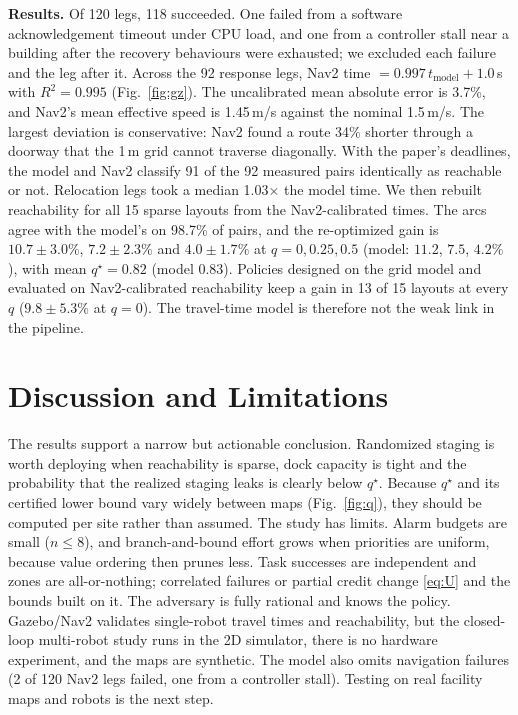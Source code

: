 \documentclass[10pt,twocolumn,letterpaper]{article}
\theoremstyle{remark}
\begin{document}
\textbf{Results.} Of 120 legs, 118 succeeded. One failed from a software acknowledgement timeout under CPU load, and one from a controller stall near a building after the recovery behaviours were exhausted; we excluded each failure and the leg after it. Across the 92 response legs, Nav2 time $=0.997\,t_{\mathrm{model}}+1.0$\,s with $R^2=0.995$ (Fig.~\ref{fig:gz}). The uncalibrated mean absolute error is 3.7\%, and Nav2's mean effective speed is 1.45\,m/s against the nominal 1.5\,m/s. The largest deviation is conservative: Nav2 found a route 34\% shorter through a doorway that the 1\,m grid cannot traverse diagonally. With the paper's deadlines, the model and Nav2 classify 91 of the 92 measured pairs identically as reachable or not. Relocation legs took a median 1.03$\times$ the model time. We then rebuilt reachability for all 15 sparse layouts from the Nav2-calibrated times. The arcs agree with the model's on 98.7\% of pairs, and the re-optimized gain is $10.7\pm3.0\%$, $7.2\pm2.3\%$ and $4.0\pm1.7\%$ at $q=0,0.25,0.5$ (model: $11.2$, $7.5$, $4.2\%$), with mean $q^\star=0.82$ (model $0.83$). Policies designed on the grid model and evaluated on Nav2-calibrated reachability keep a gain in 13 of 15 layouts at every $q$ ($9.8\pm5.3\%$ at $q=0$). The travel-time model is therefore not the weak link in the pipeline.



\section{Discussion and Limitations}
The results support a narrow but actionable conclusion. Randomized staging is worth deploying when reachability is sparse, dock capacity is tight and the probability that the realized staging leaks is clearly below $q^\star$. Because $q^\star$ and its certified lower bound vary widely between maps (Fig.~\ref{fig:q}), they should be computed per site rather than assumed. The study has limits. Alarm budgets are small ($n\le8$), and branch-and-bound effort grows when priorities are uniform, because value ordering then prunes less. Task successes are independent and zones are all-or-nothing; correlated failures or partial credit change \eqref{eq:U} and the bounds built on it. The adversary is fully rational and knows the policy. Gazebo/Nav2 validates single-robot travel times and reachability, but the closed-loop multi-robot study runs in the 2D simulator, there is no hardware experiment, and the maps are synthetic. The model also omits navigation failures (2 of 120 Nav2 legs failed, one from a controller stall). Testing on real facility maps and robots is the next step.
\end{document}
